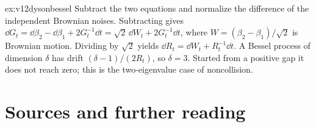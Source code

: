 \begin{solution}{ex:v12dysonbessel}
\idea Subtract the two equations and normalize the difference of the independent Brownian noises.
\writeup Subtracting gives $\dd G_t=\dd\beta_2-\dd\beta_1+2G_t^{-1}\dd t=\sqrt2\,\dd W_t+2G_t^{-1}\dd t$, where $W=(\beta_2-\beta_1)/\sqrt2$ is Brownian motion. Dividing by $\sqrt2$ yields $\dd R_t=\dd W_t+R_t^{-1}\dd t$. A Bessel process of dimension $\delta$ has drift $(\delta-1)/(2R_t)$, so $\delta=3$. Started from a positive gap it does not reach zero; this is the two-eigenvalue case of noncollision.
\end{solution}

\section*{Sources and further reading}

